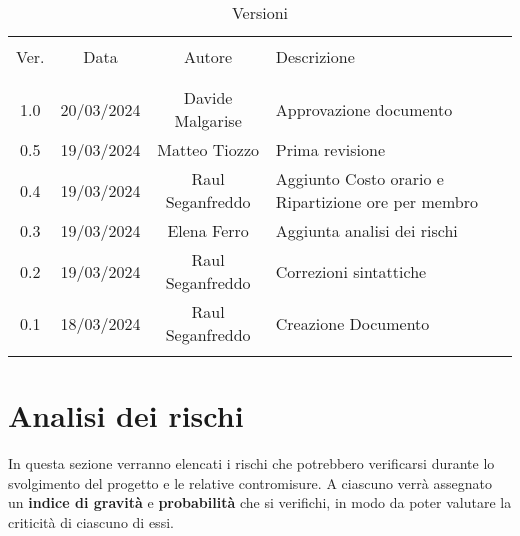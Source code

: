 \documentclass[italian,12pt]{article} %
\begin{document}


\newpage



\begin{table}[!h]
	\caption{Versioni}
	\begin{center}
		\begin{tabular}{ c c c p{9cm} }
			\hline                                                                                     \\[-2ex]
			Ver. & Data       & Autore           & Descrizione                                         \\
			\\[-2ex] \hline \\[-1.5ex]
			1.0  & 20/03/2024 & Davide Malgarise & Approvazione documento                               \\
			0.5  & 19/03/2024 & Matteo Tiozzo    & Prima revisione                                     \\
			0.4  & 19/03/2024 & Raul Seganfreddo & Aggiunto Costo orario e Ripartizione ore per membro \\
			0.3  & 19/03/2024 & Elena Ferro      & Aggiunta analisi dei rischi                         \\
			0.2  & 19/03/2024 & Raul Seganfreddo & Correzioni sintattiche                              \\
			0.1  & 18/03/2024 & Raul Seganfreddo & Creazione Documento                                 \\
			\\[-1.5ex] \hline
		\end{tabular}
	\end{center}
\end{table}

\newpage

\tableofcontents

\newpage

\section{Analisi dei rischi}
In questa sezione verranno elencati i rischi che potrebbero verificarsi durante lo svolgimento del progetto e le relative contromisure.
A ciascuno verrà assegnato un \textbf{indice di gravità} e \textbf{probabilità} che si verifichi, in modo da poter valutare la criticità di ciascuno di essi.
\end{document}
